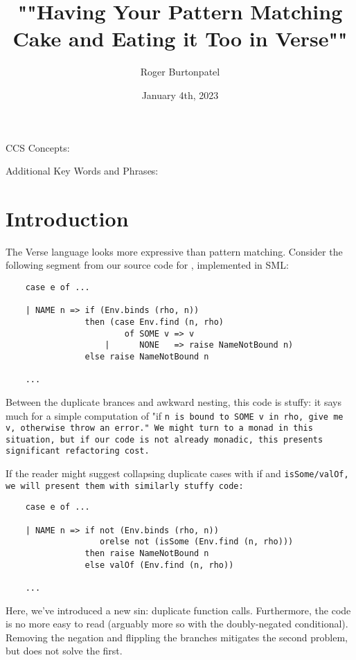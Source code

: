 \documentclass[]{article}
\title{""Having Your Pattern Matching Cake and Eating it Too in Verse""}
\author{Roger Burtonpatel}
\date{January 4th, 2023}
\begin{document}
\maketitle

CCS Concepts: 

\bigskip

Additional Key Words and Phrases: 

\bigskip

\section{Introduction}

The Verse language looks more expressive than pattern matching. 
Consider the following segment from our source code for \Vminus, implemented
in SML:

\smllst 

\begin{lstlisting}
    case e of ...

    | NAME n => if (Env.binds (rho, n))
                then (case Env.find (n, rho) 
                        of SOME v => v 
                    |      NONE   => raise NameNotBound n)
                else raise NameNotBound n 

    ...
\end{lstlisting}

Between the duplicate brances and awkward nesting, this code is stuffy: it says
much for a simple computation of "if \tt{n} is bound to \tt{SOME v} in \tt{rho},
give me \tt{v}, otherwise throw an error." We might turn to a monad in this
situation, but if our code is not already monadic, this presents significant
refactoring cost. 

\bigskip
If the reader might suggest collapsing duplicate cases with if and
\tt{isSome}/\tt{valOf}, we will present them with similarly stuffy code: 
\begin{lstlisting}
    case e of ...

    | NAME n => if not (Env.binds (rho, n))
                   orelse not (isSome (Env.find (n, rho)))
                then raise NameNotBound n 
                else valOf (Env.find (n, rho))

    ...
\end{lstlisting}

Here, we've introduced a new sin: duplicate function calls. Furthermore, the
code is no more easy to read (arguably more so with the doubly-negated
conditional). Removing the negation and flippling the branches mitigates the 
second problem, but does not solve the first. 
\end{document}
